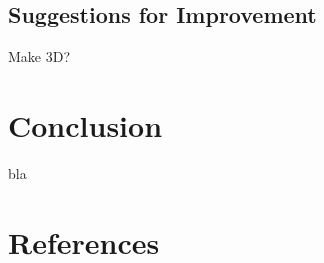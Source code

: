 \documentclass[11pt]{iopart}
\begin{document}
\subsection{Suggestions for Improvement}
Make 3D?

\section{Conclusion}
bla

\section*{References}


\end{document}
